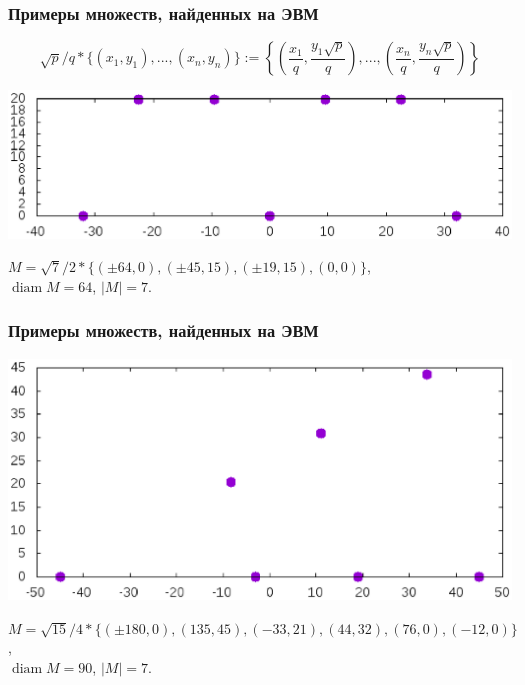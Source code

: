 \documentclass[10pt,pdf,hyperref={unicode}]{beamer}
\theoremstyle{definition}
\begin{document}
\begin{frame}
	\frametitle{Примеры множеств, найденных на ЭВМ~\cite{our-pmm-2018}}
	\begin{equation*}
		\sqrt{p}/q * \{ (x_1,y_1), ..., (x_n, y_n)  \}
		:=
		\left\{ \left(\frac{x_1}{q},\frac{y_1\sqrt{p}}{q}\right), ..., \left(\frac{x_n}{q},\frac{y_n\sqrt{p}}{q}\right)  \right\}
	\end{equation*}

	\center
	\includegraphics[width=\linewidth,trim={1 100 1 100},clip=true]{Avdeev_7_64_1538484861024.eps}


	$
	M=\sqrt{7}/2 *
	\{
	( \pm64 , 0),
	( \pm45 , 15),
	( \pm19 , 15),
	( 0 , 0)
	\}
	$,
	\\
	$\operatorname{diam} M = 64$,
	$|M| = 7$.


\end{frame}



\begin{frame}
	\frametitle{Примеры множеств, найденных на ЭВМ~\cite{our-pmm-2018}}

	\center
	\includegraphics[width=\linewidth,trim={0 50 0 50},clip=true]{Avdeev_7_90_1538485007759.eps}


	$
	M=
	\sqrt{15}/4 *
	\{
	( \pm180 , 0),
	( 135 , 45),
	( -33 , 21),
	( 44 , 32),
	( 76 , 0),
	( -12 , 0)
	\}
	$,
	\\
	$\operatorname{diam} M = 90$,
	$|M| = 7$.


\end{frame}
\end{document}
